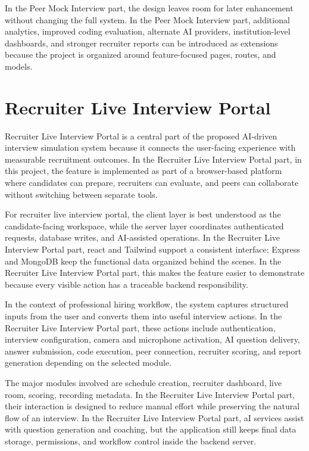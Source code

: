 \documentclass[12pt,a4paper]{report}
\begin{document}
In the Peer Mock Interview part, the design leaves room for later enhancement without changing the full system. In the Peer Mock Interview part, additional analytics, improved coding evaluation, alternate AI providers, institution-level dashboards, and stronger recruiter reports can be introduced as extensions because the project is organized around feature-focused pages, routes, and models.


\section{Recruiter Live Interview Portal}

Recruiter Live Interview Portal is a central part of the proposed AI-driven interview simulation system because it connects the user-facing experience with measurable recruitment outcomes. In the Recruiter Live Interview Portal part, in this project, the feature is implemented as part of a browser-based platform where candidates can prepare, recruiters can evaluate, and peers can collaborate without switching between separate tools.


For recruiter live interview portal, the client layer is best understood as the candidate-facing workspace, while the server layer coordinates authenticated requests, database writes, and AI-assisted operations. In the Recruiter Live Interview Portal part, react and Tailwind support a consistent interface; Express and MongoDB keep the functional data organized behind the scenes. In the Recruiter Live Interview Portal part, this makes the feature easier to demonstrate because every visible action has a traceable backend responsibility.


In the context of professional hiring workflow, the system captures structured inputs from the user and converts them into useful interview actions. In the Recruiter Live Interview Portal part, these actions include authentication, interview configuration, camera and microphone activation, AI question delivery, answer submission, code execution, peer connection, recruiter scoring, and report generation depending on the selected module.


The major modules involved are schedule creation, recruiter dashboard, live room, scoring, recording metadata. In the Recruiter Live Interview Portal part, their interaction is designed to reduce manual effort while preserving the natural flow of an interview. In the Recruiter Live Interview Portal part, aI services assist with question generation and coaching, but the application still keeps final data storage, permissions, and workflow control inside the backend server.
\end{document}
